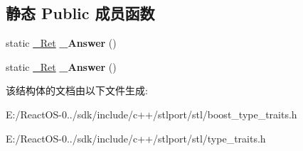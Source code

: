 \subsection*{静态 Public 成员函数}
\begin{DoxyCompactItemize}
\item 
\mbox{\label{struct___trivial_init_ab99c93554733f91478bb592685cd7f05}} 
static \hyperlink{struct____false__type}{\+\_\+\+Ret} {\bfseries \+\_\+\+Answer} ()
\item 
\mbox{\label{struct___trivial_init_ab99c93554733f91478bb592685cd7f05}} 
static \hyperlink{struct____false__type}{\+\_\+\+Ret} {\bfseries \+\_\+\+Answer} ()
\end{DoxyCompactItemize}


该结构体的文档由以下文件生成\+:\begin{DoxyCompactItemize}
\item 
E\+:/\+React\+O\+S-\/0../sdk/include/c++/stlport/stl/boost\+\_\+type\+\_\+traits.\+h\item 
E\+:/\+React\+O\+S-\/0../sdk/include/c++/stlport/stl/type\+\_\+traits.\+h\end{DoxyCompactItemize}
